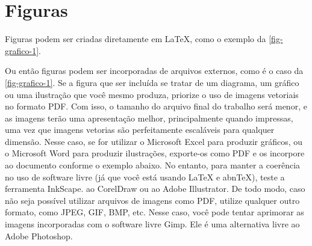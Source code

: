 \section{Figuras}

Figuras podem ser criadas diretamente em LaTeX,
como o exemplo da \ref{fig-grafico-1}.

	\begin{figure}[h!]
		\centering
	\end{figure}

Ou então figuras podem ser incorporadas de arquivos externos, como é o caso da \autoref{fig-grafico-1}. Se a figura que ser incluída se tratar de um diagrama, um gráfico ou uma ilustração que você mesmo produza, priorize o uso de imagens vetoriais no formato PDF. Com isso, o tamanho do arquivo final do trabalho será menor, e as imagens terão uma apresentação melhor, principalmente quando impressas, uma vez que imagens vetorias são perfeitamente escaláveis para qualquer dimensão. Nesse caso, se for utilizar o Microsoft Excel para produzir gráficos, ou o Microsoft Word para produzir ilustrações, exporte-os como PDF e os incorpore ao documento conforme o exemplo abaixo. No entanto, para manter a coerência no uso de software livre (já que você está usando LaTeX e abnTeX),  teste a ferramenta InkScape. ao CorelDraw ou ao Adobe Illustrator.  De todo modo, caso não seja possível  utilizar arquivos de imagens como PDF, utilize qualquer outro formato, como JPEG, GIF, BMP, etc.  Nesse caso, você pode tentar aprimorar as imagens incorporadas com o software livre Gimp. Ele é uma alternativa livre ao Adobe Photoshop.